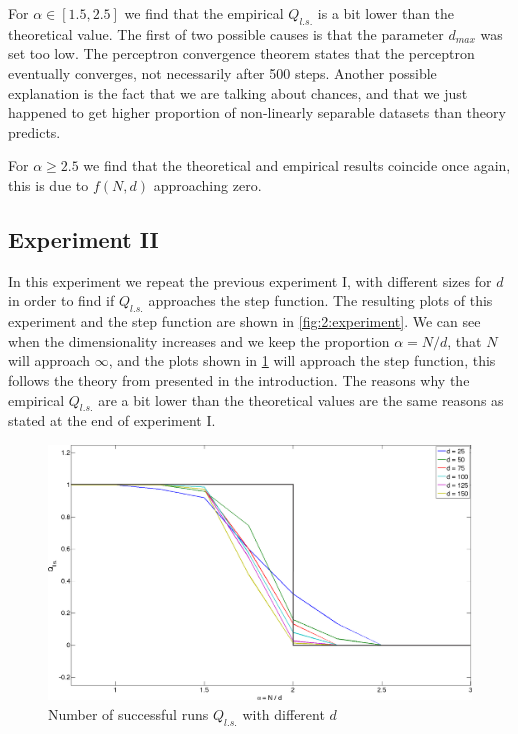 For $\alpha \in [1.5, 2.5]$ we find that the empirical $Q_{l.s.}$ is a bit lower than the theoretical value. The first of two possible causes is that the parameter $d_{max}$ was set too low. The perceptron convergence theorem states that the perceptron eventually converges, not necessarily after 500 steps. Another possible explanation is the fact that we are talking about chances, and that we just happened to get higher proportion of non-linearly separable datasets than theory predicts. 

For $\alpha \geq 2.5$ we find that the theoretical and empirical results coincide once again, this is due to $f(N,d)$ approaching zero.

\subsection*{Experiment II}

In this experiment we repeat the previous experiment I, with different sizes for $d$ in order to find if $Q_{l.s.}$ approaches the step function. The resulting plots of this experiment and the step function are shown in \vref{fig:2:experiment}. We can see when the dimensionality increases and we keep the proportion $\alpha = N/d$, that $N$ will approach $\infty$, and the plots shown in \cref{fig:2:experiment} will approach the step function, this follows the theory from \textcite{cover1965geometrical} presented in the introduction. The reasons why the empirical $Q_{l.s.}$ are a bit lower than the theoretical values are the same reasons as stated at the end of experiment I.

\begin{figure}
	\centering
	\includegraphics[width=\textwidth]{./img/assignmentb}
	\caption{Number of successful runs $Q_{l.s.}$ with different $d$}
	\label{fig:2:experiment}
\end{figure}
